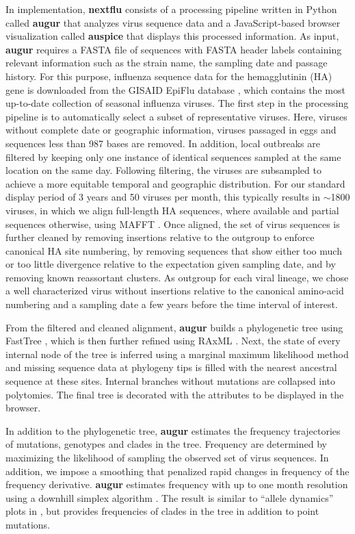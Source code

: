 \documentclass{bioinfo}
\newcommand{\augur}{\textbf{augur}}
\newcommand{\auspice}{\textbf{auspice}}
\newcommand{\nextflu}{\textbf{nextflu}}
\begin{document}
In implementation, \nextflu{} consists of a processing pipeline written in Python called \augur{} that analyzes virus sequence data and a JavaScript-based browser visualization called \auspice{} that displays this processed information.
As input, \augur{} requires a FASTA file of sequences with FASTA header labels containing relevant information such as the strain name, the sampling date and passage history.
For this purpose, influenza sequence data for the hemagglutinin (HA) gene is downloaded from the GISAID EpiFlu database \citep{GISAID}, which contains the most up-to-date collection of seasonal influenza viruses.
The first step in the processing pipeline is to automatically select a subset of representative viruses.
Here, viruses without complete date or geographic information, viruses passaged in eggs and sequences less than 987 bases are removed.
In addition, local outbreaks are filtered by keeping only one instance of identical sequences sampled at the same location on the same day.
Following filtering, the viruses are subsampled to achieve a more equitable temporal and geographic distribution.
For our standard display period of 3 years and 50 viruses per month, this typically results in $\sim$1800 viruses, in which we align full-length HA sequences, where available and partial sequences otherwise, using MAFFT \citep{katoh_mafft_2013}.
Once aligned, the set of virus sequences is further cleaned by removing insertions relative to the outgroup to enforce canonical HA site numbering, by removing sequences that show either too much or too little divergence relative to the expectation given sampling date, and by removing known reassortant clusters. As outgroup for each viral lineage, we chose a well characterized virus without insertions relative to the canonical amino-acid numbering and a sampling date a few years before the time interval of interest.

From the filtered and cleaned alignment, \augur{} builds a phylogenetic tree using FastTree \citep{price_fasttree_2009}, which is then further refined using RAxML \citep{stamatakis_raxml_2014}.
Next, the state of every internal node of the tree is inferred using a marginal maximum likelihood method and missing sequence data at phylogeny tips is filled with the nearest ancestral sequence at these sites.
Internal branches without mutations are collapsed into polytomies.
The final tree is decorated with the attributes to be displayed in the browser.

In addition to the phylogenetic tree, \augur{} estimates the frequency trajectories of mutations, genotypes and clades in the tree. Frequency are determined by maximizing the likelihood of sampling the observed set of virus sequences. In addition, we impose a smoothing that penalized rapid changes in frequency of the frequency derivative. \augur{} estimates frequency with up to one month resolution using a downhill simplex algorithm \citep{oliphant_python_2007}. The result is similar to ``allele dynamics'' plots in \citep{steinbruck_allele_2011}, but provides frequencies of clades in the tree in addition to point mutations.
\end{document}

